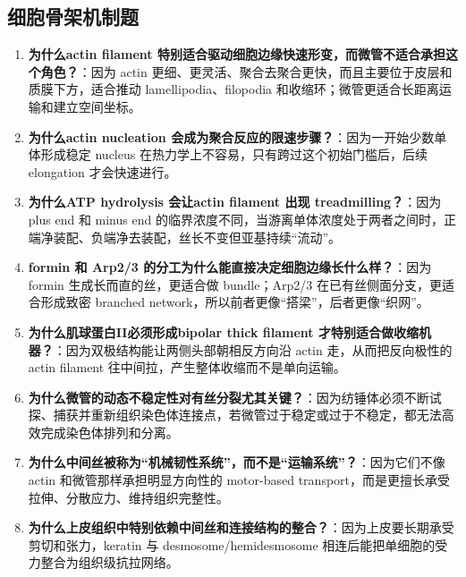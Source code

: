 \documentclass[12pt,fontset=none]{ctexart}
\begin{document}
\subsection*{细胞骨架机制题}
\begin{enumerate}
\item \textbf{为什么actin filament 特别适合驱动细胞边缘快速形变，而微管不适合承担这个角色？}：因为 actin 更细、更灵活、聚合去聚合更快，而且主要位于皮层和质膜下方，适合推动 lamellipodia、filopodia 和收缩环；微管更适合长距离运输和建立空间坐标。

\item \textbf{为什么actin nucleation 会成为聚合反应的限速步骤？}：因为一开始少数单体形成稳定 nucleus 在热力学上不容易，只有跨过这个初始门槛后，后续 elongation 才会快速进行。

\item \textbf{为什么ATP hydrolysis 会让actin filament 出现 treadmilling？}：因为 plus end 和 minus end 的临界浓度不同，当游离单体浓度处于两者之间时，正端净装配、负端净去装配，丝长不变但亚基持续“流动”。

\item \textbf{formin 和 Arp2/3 的分工为什么能直接决定细胞边缘长什么样？}：因为 formin 生成长而直的丝，更适合做 bundle；Arp2/3 在已有丝侧面分支，更适合形成致密 branched network，所以前者更像“搭梁”，后者更像“织网”。

\item \textbf{为什么肌球蛋白II必须形成bipolar thick filament 才特别适合做收缩机器？}：因为双极结构能让两侧头部朝相反方向沿 actin 走，从而把反向极性的 actin filament 往中间拉，产生整体收缩而不是单向运输。

\item \textbf{为什么微管的动态不稳定性对有丝分裂尤其关键？}：因为纺锤体必须不断试探、捕获并重新组织染色体连接点，若微管过于稳定或过于不稳定，都无法高效完成染色体排列和分离。

\item \textbf{为什么中间丝被称为“机械韧性系统”，而不是“运输系统”？}：因为它们不像 actin 和微管那样承担明显方向性的 motor-based transport，而是更擅长承受拉伸、分散应力、维持组织完整性。

\item \textbf{为什么上皮组织中特别依赖中间丝和连接结构的整合？}：因为上皮要长期承受剪切和张力，keratin 与 desmosome/hemidesmosome 相连后能把单细胞的受力整合为组织级抗拉网络。
\end{enumerate}

\end{document}
